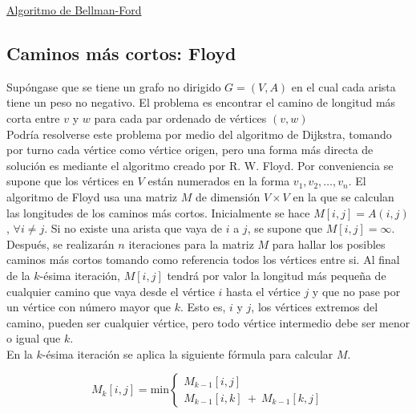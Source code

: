 \underline{Algoritmo de Bellman-Ford}\\


\subsection{Caminos más cortos: Floyd}

Supóngase que se tiene un grafo no dirigido $G = (V,A)$ en el cual cada arista tiene un peso no negativo. El problema es encontrar el camino de longitud más corta entre $v$ y $w$ para cada par ordenado de vértices $(v,w)$\\

Podría resolverse este problema por medio del algoritmo de Dijkstra, tomando por turno cada vértice como vértice origen, pero una forma más directa de solución es mediante el algoritmo creado por R. W. Floyd. Por conveniencia se supone que los vértices en $V$ están numerados en la forma $v_1, v_2, \ldots, v_n$. El algoritmo de Floyd usa una matriz $M$ de dimensión $V \times V$ en la que se calculan las longitudes de los caminos más cortos. Inicialmente se hace $M[i,j] = A(i,j)$, $\forall i \neq j$. Si no existe una arista que vaya de $i$ a $j$, se supone que $M[i,j] = \infty$.\\

Después, se realizarán $n$ iteraciones para la matriz $M$ para hallar los posibles caminos más cortos tomando como referencia todos los vértices entre si. Al final de la $k$-ésima iteración, $M[i,j]$ tendrá por valor la longitud más pequeña de cualquier camino que vaya desde el vértice $i$ hasta el vértice $j$ y que no pase por un vértice con número mayor que $k$. Esto es, $i$ y $j$, los vértices extremos del camino, pueden ser cualquier vértice, pero todo vértice intermedio debe ser menor o igual que $k$.\\

En la $k$-ésima iteración se aplica la siguiente fórmula para calcular $M$.

\[ M_k[i,j] = \mbox{min}
\left\{ 
  \begin{array}{l} 
    M_{k-1}[i,j]  \\ 
    M_{k-1}[i,k]\ +\ M_{k-1}[k,j]
  \end{array} 
\right. \]

